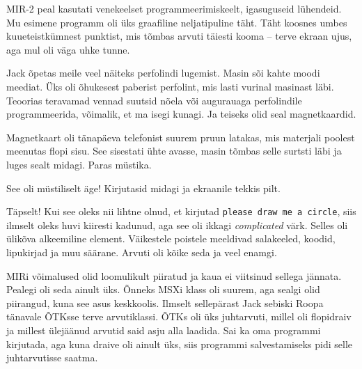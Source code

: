 MIR-2 peal kasutati venekeelset programmeerimiskeelt, igasuguseid
lühendeid. Mu esimene programm oli üks graafiline neljatipuline täht. Täht
koosnes umbes kuueteistkümnest punktist, mis 
tõmbas arvuti täiesti kooma – terve ekraan ujus, aga mul oli väga uhke tunne. 

Jack õpetas meile veel näiteks 
perfolindi lugemist. Masin sõi kahte moodi meediat. Üks oli õhukesest paberist 
perfolint, mis lasti vurinal masinast läbi. Teoorias teravamad vennad 
suutsid nõela või augurauaga perfolindile programmeerida, võimalik, et ma isegi 
kunagi. Ja teiseks olid seal magnetkaardid. 


Magnetkaart oli tänapäeva telefonist suurem pruun latakas, mis materjali 
poolest meenutas flopi sisu. See sisestati ühte
avasse, masin tõmbas selle 
surtsti läbi ja luges sealt midagi. Paras müstika. 


See oli müstiliselt äge! Kirjutasid midagi ja ekraanile 
tekkis pilt.


Täpselt! Kui see oleks nii lihtne olnud, et kirjutad \verb|please draw me a circle|, 
siis ilmselt oleks huvi kiiresti kadunud, aga see oli ikkagi \emph{complicated} 
värk. 
Selles oli ülikõva alkeemiline element. Väikestele poistele 
meeldivad salakeeled, koodid, lipukirjad ja muu säärane. Arvuti
oli kõike seda ja veel enamgi.

MIRi võimalused olid loomulikult piiratud ja kaua ei viitsinud sellega
jännata. Pealegi oli seda ainult üks. Õnneks MSXi klass oli
suurem, aga sealgi olid piirangud, kuna see asus 
keskkoolis. Ilmselt sellepärast Jack sebiski 
Roopa tänavale ÕTKsse terve arvutiklassi. ÕTKs oli üks
juhtarvuti, millel oli flopidraiv ja millest ülejäänud arvutid said 
asju alla laadida. Sai ka oma programmi kirjutada, aga kuna 
draive oli ainult üks, siis programmi salvestamiseks pidi selle 
juhtarvutisse saatma. 

